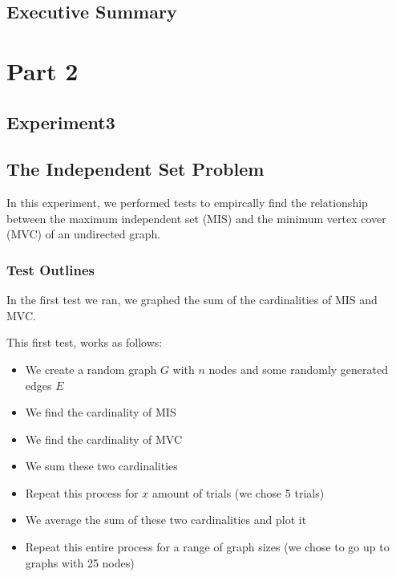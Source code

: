 \documentclass[12pt]{article}
\begin{document}
\subsection{Executive Summary}


%
%
%
%
\newpage
\section{Part 2}
\subsection{Experiment3}

%
%
%
%
\newpage
\subsection{The Independent Set Problem}
In this experiment, we performed tests to empircally find the relationship between the maximum 
independent set (MIS) and the minimum vertex cover (MVC) of an undirected graph.

\subsubsection{Test Outlines}

In the first test we ran, we graphed the sum of the cardinalities of MIS and MVC.

This first test, works as follows:

\begin{itemize}
    \item We create a random graph $G$ with $n$ nodes and some randomly generated edges $E$
    \item We find the cardinality of MIS
    \item We find the cardinality of MVC
    \item We sum these two cardinalities 
    \item Repeat this process for $x$ amount of trials (we chose 5 trials)
    \item We average the sum of these two cardinalities and plot it 
    \item Repeat this entire process for a range of graph sizes (we chose to go up to graphs with 25 nodes)
\end{itemize}
\end{document}
